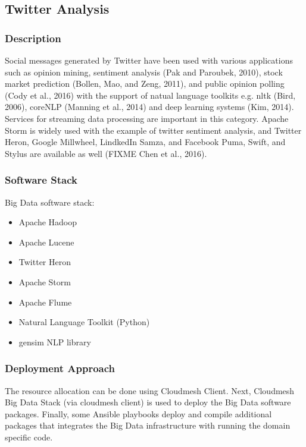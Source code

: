 \documentclass[9pt,twocolumn,twoside]{styles/osajnl}
\begin{document}
\subsection{Twitter Analysis}

\subsubsection{Description}

Social messages generated by Twitter have been used with various
applications such as opinion mining, sentiment analysis (Pak and
Paroubek, 2010), stock market prediction (Bollen, Mao, and Zeng,
2011), and public opinion polling (Cody et al., 2016) with the support
of natual language toolkits e.g. nltk (Bird, 2006), coreNLP (Manning
et al., 2014) and deep learning systems (Kim, 2014). Services for
streaming data processing are important in this category. Apache Storm
is widely used with the example of twitter sentiment analysis, and
Twitter Heron, Google Millwheel, LindkedIn Samza, and Facebook Puma,
Swift, and Stylus are available as well (FIXME Chen et al., 2016).

\subsubsection{Software Stack}

Big Data software stack:

\begin{itemize}
\item Apache Hadoop
\item Apache Lucene
\item Twitter Heron
\item Apache Storm
\item Apache Flume
\item Natural Language Toolkit (Python)
\item gensim NLP library
\end{itemize}

\subsubsection{Deployment Approach}

The resource allocation can be done using Cloudmesh Client.  Next,
Cloudmesh Big Data Stack (via cloudmesh client) is used to deploy the
Big Data software packages.  Finally, some Ansible playbooks deploy
and compile additional packages that integrates the Big Data
infrastructure with running the domain specific code.
\end{document}
